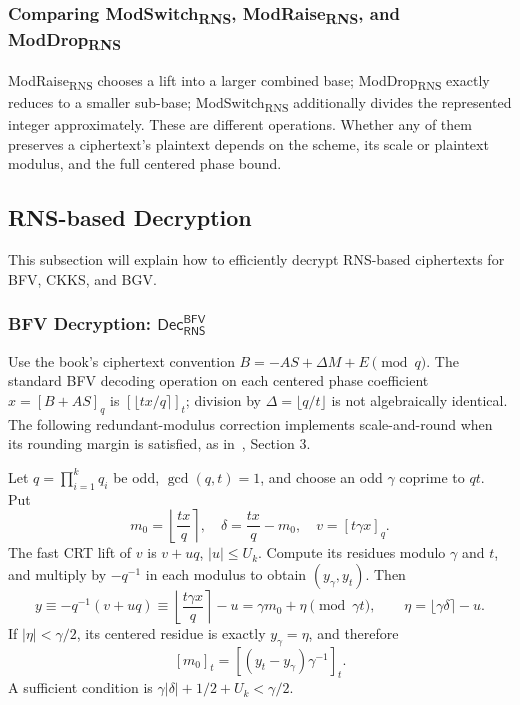 \subsubsection{Comparing \textsf{ModSwitch\textsubscript{RNS}}, \textsf{ModRaise\textsubscript{RNS}}, and \textsf{ModDrop\textsubscript{RNS}}}

\textsf{ModRaise\textsubscript{RNS}} chooses a lift into a larger combined base; \textsf{ModDrop\textsubscript{RNS}} exactly reduces to a smaller sub-base; \textsf{ModSwitch\textsubscript{RNS}} additionally divides the represented integer approximately. These are different operations. Whether any of them preserves a ciphertext's plaintext depends on the scheme, its scale or plaintext modulus, and the full centered phase bound.




\subsection{RNS-based Decryption}
\label{subsec:rns-dec}

This subsection will explain how to efficiently decrypt RNS-based ciphertexts for BFV, CKKS, and BGV.


\subsubsection{BFV Decryption: $\textsf{Dec}_{\textsf{RNS}}^{\textsf{BFV}}$}
\label{subsubsec:rns-dec-bfv}

Use the book's ciphertext convention $B=-AS+\Delta M+E\pmod q$. The standard BFV decoding operation on each centered phase coefficient $x=[B+AS]_q$ is $[\lfloor tx/q\rceil]_t$; division by $\Delta=\lfloor q/t\rfloor$ is not algebraically identical. The following redundant-modulus correction implements scale-and-round when its rounding margin is satisfied, as in~\cite{rns-bfv}, Section 3.

Let $q=\prod_{i=1}^kq_i$ be odd, $\gcd(q,t)=1$, and choose an odd $\gamma$ coprime to $qt$. Put
\[
m_0=\left\lfloor\frac{tx}{q}\right\rceil,\quad
\delta=\frac{tx}{q}-m_0,\quad v=[t\gamma x]_q.
\]
The fast CRT lift of $v$ is $v+uq$, $|u|\leq U_k$. Compute its residues modulo $\gamma$ and $t$, and multiply by $-q^{-1}$ in each modulus to obtain $(y_\gamma,y_t)$. Then
\[
y\equiv-q^{-1}(v+uq)
\equiv\left\lfloor\frac{t\gamma x}{q}\right\rceil-u
=\gamma m_0+\eta\pmod{\gamma t},
\qquad \eta=\lfloor\gamma\delta\rceil-u.
\]
If $|\eta|<\gamma/2$, its centered residue is exactly $y_\gamma=\eta$, and therefore
\[
[m_0]_t=[(y_t-y_\gamma)\gamma^{-1}]_t.
\]
A sufficient condition is $\gamma|\delta|+1/2+U_k<\gamma/2$.

